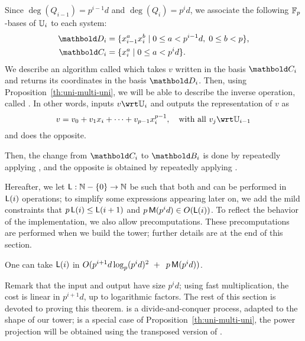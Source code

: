 Since $\deg(Q_{i-1})=p^{i-1}d$ and $\deg(Q_{i})=p^id$, we associate
the following $\mathbb{F}_p$-bases of $\mathbb{U}_i$ to each system:
\begin{align}
  \pdfmctwo{Explicit indices for the basis.}
  \basis{D}_i &= \{x_{i-1}^ax_i^b \;|\; 0\le a<p^{i-1}d,\; 0\le b<p\}
  \text{,}\\
  \label{eq:bases}
 \basis{C}_i&=\{x_i^a \;|\; 0\le a<p^id\}
 \text{.}  
\end{align}
We describe an algorithm called  which takes $v$
written in the basis $\basis{C}_i$ and returns its coordinates in the
basis $\basis{D}_i$. Then, using Proposition~\ref{th:uni-multi-uni},
we will be able to describe the inverse operation, called
.
In other words,  inputs $v\wrt\U_i$ and
outputs the representation of $v$ as
\begin{equation}
  \label{eq:vectorspace}
  v = v_0 + v_1x_i + \cdots + v_{p-1}x_i^{p-1}, \quad\text{with all~} v_j \wrt \U_{i-1}
\end{equation}
and  does the opposite.

Then, the change from $\basis{C}_i$ to $\basis{B}_i$ is done by
repeatedly applying , and the opposite is obtained by
repeatedly applying .

Hereafter, we let $\mathsf{L}:\mathbb{N}-\{0\} \to \mathbb{N}$ be such that both
 and  can be performed in
$\mathsf{L}(i)$ operations; to simplify some expressions appearing later
on, we add the mild constraints that $p\,\mathsf{L}(i) \le \mathsf{L}(i+1)$ and
$p\,\mathsf{M}(p^{i}d) \in O(\mathsf{L}(i))$.  To reflect the behavior of the
implementation, we also allow precomputations. These precomputations
are performed when we build the tower; further details are at the end
of this section.
\begin{theorem}\label{theo:L}
  One can take $\mathsf{L}(i)$ in $O( p^{i+1}d\log_p(p^id)^2 \ + \
\,p\,\mathsf{M}(p^{i}d))$.
\end{theorem}
Remark that the input and output have size $p^id$; using fast
multiplication, the cost is linear in $p^{i+1}d$, up to logarithmic
factors. The rest of this section is devoted to proving this theorem.
\titleref{alg:push-down} is a divide-and-conquer process, adapted to the shape
of our tower; \titleref{alg:liftup} is a special case of
Proposition~\ref{th:uni-multi-uni}, the power projection will be
obtained using the transposed version of \titleref{alg:push-down}.

